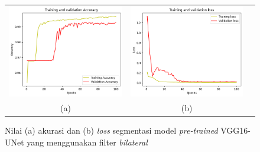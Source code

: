 \begin{enumerate}
	
	\begin{figure}[htbp]
		\centering
		\begin{tabular}{ccc}
			\includegraphics[scale=0.5]{bab4/acc-bilateral-vggunet.png} &
			\includegraphics[scale=0.5]{bab4/loss-bilateral-vggunet.png} & \\
			(a) & (b)    %
		\end{tabular}
		\caption{Nilai (a) akurasi dan (b) \textit{loss} segmentasi model \textit{pre-trained} VGG16-UNet yang menggunakan filter \textit{bilateral}}
		\label{fig:performance-bilateral-vggunet}
	\end{figure}
	

\end{enumerate}
